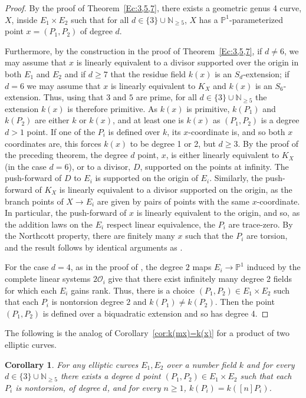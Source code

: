 \documentclass[a4paper,11pt]{amsart}
\theoremstyle{plain}
\newtheorem{coroll}[thm]{Corollary}
\theoremstyle{remark}
\newcommand{\nn}{\mathbb{N}}
\begin{document}
\begin{proof}
    By the proof of Theorem~\ref{Ec:3,5,7}, there exists a geometric genus 4 curve, $X$, inside $E_1 \times E_2$ such that for all $d \in \{3\} \cup \mathbb{N}_{\geq 5}$, $X$ has a $\mathbb{P}^1$-parameterized point \(x =(P_1,P_2)\) of degree $d$. 
    
    Furthermore, by the construction in the proof of Theorem~\ref{Ec:3,5,7}, if \(d \neq 6\), we may assume that \(x\) is linearly equivalent to a divisor supported over the origin in both \(E_1\) and \(E_2\) and if \(d \geq 7\) that the residue field \(k(x)\) is an \(S_d\)-extension; if \(d=6\) we may assume that \(x\) is linearly equivalent to \(K_X\) and \(k(x)\) is an \(S_6\)-extension.  Thus, using that \(3\) and \(5\) are prime, for all $d \in \{3\} \cup \mathbb{N}_{\geq 5}$
    the extension $k(x)$ is therefore primitive. As $k(x)$ is primitive, $k(P_1)$ and $k(P_2)$ are either $k$ or $k(x)$, and at least one is $k(x)$ as $(P_1, P_2)$ is a degree $d > 1$ point. If one of the $P_i$ is defined over $k$, its $x$-coordinate is, and so both $x$ coordinates are, this forces $k(x)$ to be degree 1 or 2, but $d \geq 3$. By the proof of the preceding theorem, the degree $d$ point, $x$, is either linearly equivalent to $K_X$ (in the case $d = 6$), or to a divisor, $D$, supported on the points at infinity. The push-forward of $D$ to $E_i$ is supported on the origin of $E_i$. Similarly, the push-forward of $K_X$ is linearly equivalent to a divisor supported on the origin, as the branch points of $X \to E_i$ are given by pairs of points with the same $x$-coordinate. In particular, the push-forward of $x$ is linearly equivalent to the origin, and so, as the addition laws on the $E_i$ respect linear equivalence, the $P_i$ are trace-zero. By the Northcott property, there are finitely many $x$ such that the $P_i$ are torsion, and the result follows by identical arguments as . 

    For the case $d = 4$, as in the proof of  , the degree $2$ maps $E_i\to\mathbb{P}^1$ induced by the complete linear systems $2\mathcal{O}_i$ give that there exist infinitely many degree 2 fields for which each $E_i$ gains rank. 
    Thus, there is a choice $(P_1,P_2)\in E_1\times E_2$ such that each $P_i$ is nontorsion degree $2$ and $k(P_1)\neq k(P_2)$.
    Then the point $(P_1, P_2)$ is defined over a biquadratic extension and so has degree 4.
\end{proof}

The following is the analog of Corollary~\ref{cor:k(mx)=k(x)} for a product of two elliptic curves.
\begin{coroll}\label{cor:k(P1,P2)=k(nP1,nP2)} For any elliptic curves $E_1, E_2$ over a number field $k$ and for every $d\in \{3\}\cup\nn_{\geq 5}$ there exists a degree $d$ point $(P_1,P_2)\in E_1\times E_2$ such that each $P_i$ is nontorsion, of degree $d$, and for every $n\geq 1$, $k(P_i)=k([n]P_i)$. 
    \end{coroll} 
\end{document}
